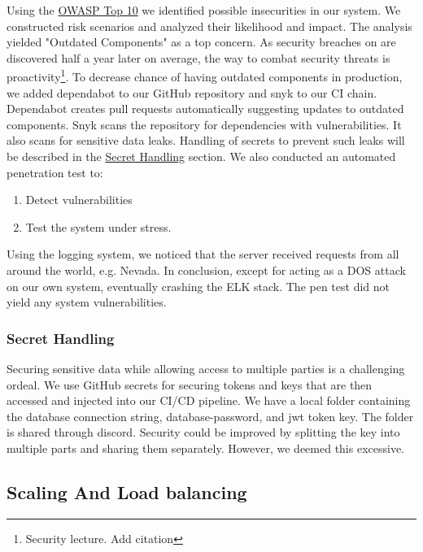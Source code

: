 Using the \href{https://owasp.org/Top10/}{OWASP Top 10} we identified possible insecurities in our system. We constructed risk scenarios and analyzed their likelihood and impact. 
The analysis yielded "Outdated Components" as a top concern. As security breaches on are discovered half a year later on average, the way to combat security threats is proactivity\footnote{Security lecture. Add citation}. To decrease chance of having outdated components in production, we added dependabot to our GitHub repository and snyk to our CI chain. Dependabot creates pull requests automatically suggesting updates to outdated components. Snyk scans the repository for dependencies with vulnerabilities. It also scans for sensitive data leaks. Handling of secrets to prevent such leaks will be described in the \hyperref[subsubsec:secrets]{Secret Handling} section.
We also conducted an automated penetration test to:
\begin{enumerate}
    \item Detect vulnerabilities
    \item Test the system under stress.
\end{enumerate}
Using the logging system, we noticed that the server received requests from all around the world, e.g. Nevada. In conclusion, except for acting as a DOS attack on our own system, eventually crashing the ELK stack. The pen test did not yield any system vulnerabilities.

\subsubsection{Secret Handling}
\label{subsubsec:secrets}
Securing sensitive data while allowing access to multiple parties is a challenging ordeal. We use GitHub secrets for securing tokens and keys that are then accessed and injected into our CI/CD pipeline. We have a local folder containing the database connection string, database-password, and jwt token key. The folder is shared through discord. Security could be improved by splitting the key into multiple parts and sharing them separately. However, we deemed this excessive.
\clearpage
\subsection{Scaling And Load balancing}
\label{subsec:scaling}

